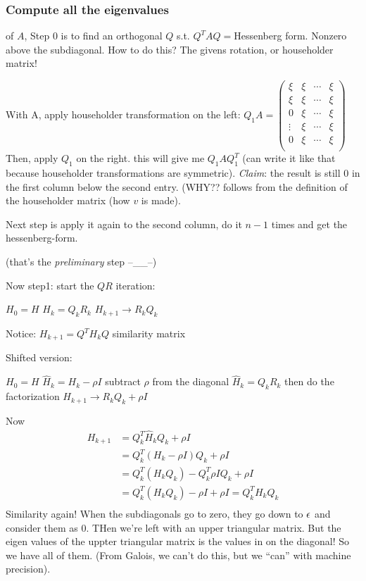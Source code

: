 \subsubsection{Compute all the eigenvalues}
of $A$,
Step 0 is to find an orthogonal $Q$ s.t. $Q^TAQ = $Hessenberg
  form. Nonzero above the subdiagonal.
How to do this? The givens rotation, or householder matrix!

With A, apply householder transformation on the left: $Q_1A =
\begin{pmatrix}
 \xi & \xi &\cdots & \xi\\
 \xi &\xi &\cdots & \xi\\
 0 &\xi &\cdots & \xi\\
\vdots & \xi &\cdots & \xi\\
0 &\xi&\cdots & \xi\\
 \end{pmatrix}
$
Then, apply $Q_1$ on the right. this will give me $Q_1AQ_1^T$ (can
write it like that because householder transformations are symmetric).
\emph{Claim}: the result is still 0 in the first column below the
second entry. (WHY?? follows from the definition of the householder
matrix (how $v$ is made).

Next step is apply it again to the second column, do it $n-1$ times
and get the hessenberg-form.

(that's the \emph{preliminary} step --\_\_--)

Now step1: start the $QR$ iteration:
\begin{algorithmic}
\STATE$H_0=H$
\STATE $H_k=Q_kR_k$
\STATE $H_{k+1}\to R_kQ_k$ 
\ENDFOR  
\end{algorithmic}

Notice: $H_{k+1}= Q^TH_kQ$ similarity matrix

Shifted version:
\begin{algorithmic}
\STATE$H_0=H$
\STATE $\hat H_k=H_k - \rho I$ subtract $\rho$ from the diagonal
\STATE $\hat H_k=Q_kR_k$ then do the factorization
\STATE $ H_{k+1}\to R_kQ_k + \rho I$ 
\ENDFOR  
\end{algorithmic}
 Now 
 \begin{align*}
H_{k+1} &= Q_k^T\hat H_k Q_k + \rho I\\   
&= Q_k^T(H_k -\rho I)Q_k + \rho I\\   
&=Q_k^T(H_kQ_k) - Q_k^T\rho I Q_k + \rho I\\
&=Q_k^T(H_kQ_k) - \rho I + \rho I = Q_k^TH_kQ_k\\
 \end{align*}
Similarity again!
When the subdiagonals go to zero, they go down to $\epsilon$ and consider
them as 0. THen we're left with an upper triangular matrix. But the
eigen values of the uppter triangular matrix is the values in on the
diagonal! So we have all of them. (From Galois, we can't do this, but
we ``can'' with machine precision).

